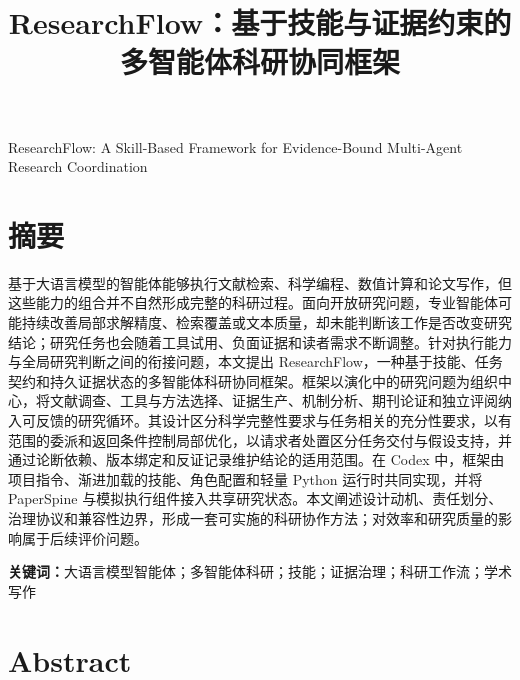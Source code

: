 \documentclass[UTF8,fontset=fandol,a4paper,11pt]{ctexart}
\title{ResearchFlow：基于技能与证据约束的多智能体科研协同框架}
\author{}
\date{}
\begin{document}
\maketitle

\begin{center}\large ResearchFlow: A Skill-Based Framework for Evidence-Bound Multi-Agent Research Coordination\end{center}

\section*{摘要}

基于大语言模型的智能体能够执行文献检索、科学编程、数值计算和论文写作，但这些能力的组合并不自然形成完整的科研过程。面向开放研究问题，专业智能体可能持续改善局部求解精度、检索覆盖或文本质量，却未能判断该工作是否改变研究结论；研究任务也会随着工具试用、负面证据和读者需求不断调整。针对执行能力与全局研究判断之间的衔接问题，本文提出 ResearchFlow，一种基于技能、任务契约和持久证据状态的多智能体科研协同框架。框架以演化中的研究问题为组织中心，将文献调查、工具与方法选择、证据生产、机制分析、期刊论证和独立评阅纳入可反馈的研究循环。其设计区分科学完整性要求与任务相关的充分性要求，以有范围的委派和返回条件控制局部优化，以请求者处置区分任务交付与假设支持，并通过论断依赖、版本绑定和反证记录维护结论的适用范围。在 Codex 中，框架由项目指令、渐进加载的技能、角色配置和轻量 Python 运行时共同实现，并将 PaperSpine 与模拟执行组件接入共享研究状态。本文阐述设计动机、责任划分、治理协议和兼容性边界，形成一套可实施的科研协作方法；对效率和研究质量的影响属于后续评价问题。

\textbf{关键词：}大语言模型智能体；多智能体科研；技能；证据治理；科研工作流；学术写作

\section*{Abstract}
\end{document}
